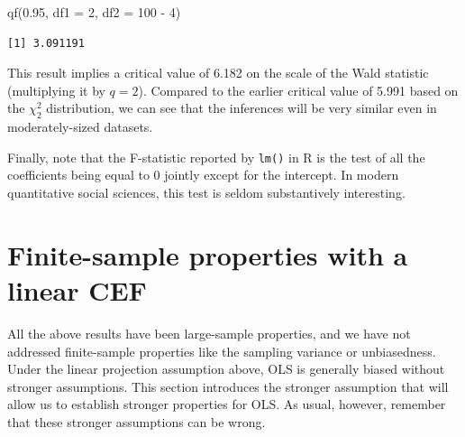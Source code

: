 \documentclass[
  letterpaper,
  DIV=11,
  numbers=noendperiod]{scrreprt}
\newenvironment{Shaded}{\begin{snugshade}}{\end{snugshade}}
\newcommand{\AttributeTok}[1]{\textcolor[rgb]{0.40,0.45,0.13}{#1}}
\newcommand{\DecValTok}[1]{\textcolor[rgb]{0.68,0.00,0.00}{#1}}
\newcommand{\FloatTok}[1]{\textcolor[rgb]{0.68,0.00,0.00}{#1}}
\newcommand{\FunctionTok}[1]{\textcolor[rgb]{0.28,0.35,0.67}{#1}}
\newcommand{\NormalTok}[1]{\textcolor[rgb]{0.00,0.23,0.31}{#1}}
\newcommand{\SpecialCharTok}[1]{\textcolor[rgb]{0.37,0.37,0.37}{#1}}
\theoremstyle{plain}
\theoremstyle{definition}
\theoremstyle{definition}
\theoremstyle{remark}
\begin{document}
\begin{Shaded}
\begin{Highlighting}[]
\FunctionTok{qf}\NormalTok{(}\FloatTok{0.95}\NormalTok{, }\AttributeTok{df1 =} \DecValTok{2}\NormalTok{, }\AttributeTok{df2 =} \DecValTok{100} \SpecialCharTok{{-}} \DecValTok{4}\NormalTok{)}
\end{Highlighting}
\end{Shaded}

\begin{verbatim}
[1] 3.091191
\end{verbatim}

This result implies a critical value of 6.182 on the scale of the Wald
statistic (multiplying it by \(q = 2\)). Compared to the earlier
critical value of 5.991 based on the \(\chi^2_2\) distribution, we can
see that the inferences will be very similar even in moderately-sized
datasets.

Finally, note that the F-statistic reported by \texttt{lm()} in R is the
test of all the coefficients being equal to 0 jointly except for the
intercept. In modern quantitative social sciences, this test is seldom
substantively interesting.

\hypertarget{finite-sample-properties-with-a-linear-cef}{%
\section{Finite-sample properties with a linear
CEF}\label{finite-sample-properties-with-a-linear-cef}}

All the above results have been large-sample properties, and we have not
addressed finite-sample properties like the sampling variance or
unbiasedness. Under the linear projection assumption above, OLS is
generally biased without stronger assumptions. This section introduces
the stronger assumption that will allow us to establish stronger
properties for OLS. As usual, however, remember that these stronger
assumptions can be wrong.
\end{document}
